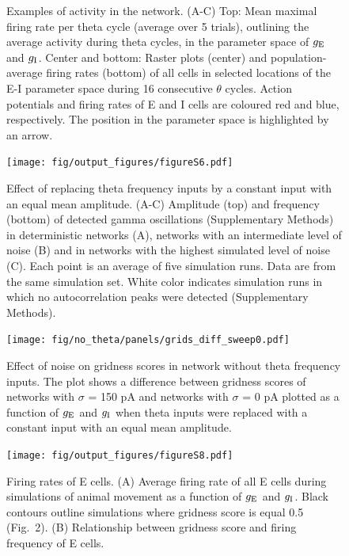 \documentclass[a4paper,12pt]{article}
\newcommand{\ssc}[3]{\ensuremath{#1_{\text{#2}_{\text{#3}}}}}
\newcommand{\gE      }{\ssc{g}      {\scriptsize{E}}{}}
\newcommand{\gI      }{\ssc{g}      {\scriptsize{I}}{}}
\begin{document}
\begin{figure}[H]
    \caption{Examples of activity in the network. (A-C) Top: Mean maximal
    firing rate per theta cycle (average over 5 trials), outlining the average
    activity during theta cycles, in the parameter space of $\gE$ and $\gI$.
    Center and bottom: Raster plots (center) and population-average firing
    rates (bottom) of all cells in selected locations of the E-I parameter
    space during 16 consecutive $\theta$ cycles. Action potentials and firing
    rates of E and I cells are coloured red and blue, respectively. The position
    in the parameter space is highlighted by an arrow.}
\end{figure}

\clearpage

\begin{figure}[ht!]
    \centering
        \texttt{[image: fig/output\_figures/figureS6.pdf]}
    \caption{Effect of replacing theta frequency inputs by a constant input
    with an equal mean amplitude. (A-C) Amplitude (top) and frequency (bottom)
    of detected gamma oscillations (Supplementary Methods) in deterministic
    networks (A), networks with an intermediate level of noise (B) and in
    networks with the highest simulated level of noise (C). Each point is an
    average of five simulation runs. Data are from the same simulation set.
    White color indicates simulation runs in which no autocorrelation peaks
    were detected (Supplementary Methods).}
\end{figure}

\clearpage

\begin{figure}[ht!]
    \centering
        \texttt{[image: fig/no\_theta/panels/grids\_diff\_sweep0.pdf]}
    \caption{Effect of noise on gridness scores in network without theta
    frequency inputs. The plot shows a difference between gridness scores
    of networks with $\sigma$ = 150 pA and networks with $\sigma$ = 0 pA
    plotted as a function of $\gE$ and $\gI$ when theta inputs were replaced
    with a constant input with an equal mean amplitude.}
\end{figure}

\clearpage

\begin{figure}[ht!]
    \centering
        \texttt{[image: fig/output\_figures/figureS8.pdf]}
    \caption{Firing rates of E cells. (A) Average firing rate of all E cells
    during simulations of animal movement as a function of $\gE$ and $\gI$.
    Black contours outline simulations where gridness score is equal 0.5
    (Fig.~2). (B) Relationship between gridness score and firing frequency of
    E cells.}
\end{figure}
\end{document}
